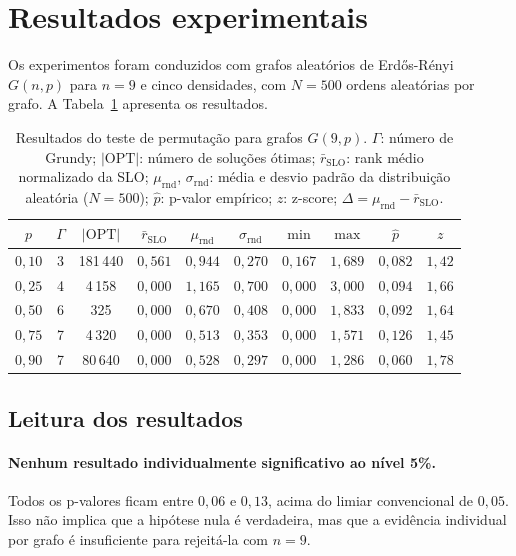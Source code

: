 \documentclass[a4paper,11pt]{article}
\begin{document}
\section{Resultados experimentais}

Os experimentos foram conduzidos com grafos aleatórios de Erdős-Rényi
$G(n,p)$ para $n=9$ e cinco densidades, com $N=500$ ordens aleatórias
por grafo. A Tabela~\ref{tab:resultados} apresenta os resultados.

\begin{table}[ht]
\centering
\caption{Resultados do teste de permutação para grafos $G(9, p)$.
$\Gamma$: número de Grundy; $|\text{OPT}|$: número de soluções ótimas;
$\bar{r}_{\text{SLO}}$: rank médio normalizado da SLO;
$\mu_{\text{rnd}}$, $\sigma_{\text{rnd}}$: média e desvio padrão da
distribuição aleatória ($N=500$);
$\hat{p}$: p-valor empírico; $z$: z-score; $\Delta = \mu_{\text{rnd}} -
\bar{r}_{\text{SLO}}$.}
\label{tab:resultados}
\renewcommand{\arraystretch}{1.25}
\begin{tabular}{cccccccccc}
\toprule
$p$ & $\Gamma$ & $|\text{OPT}|$ & $\bar{r}_{\text{SLO}}$ &
$\mu_{\text{rnd}}$ & $\sigma_{\text{rnd}}$ &
$\min$ & $\max$ & $\hat{p}$ & $z$ \\
\midrule
$0{,}10$ & 3 & 181\,440 & $0{,}561$ & $0{,}944$ & $0{,}270$ &
  $0{,}167$ & $1{,}689$ & $0{,}082$ & $1{,}42$ \\
$0{,}25$ & 4 & 4\,158   & $0{,}000$ & $1{,}165$ & $0{,}700$ &
  $0{,}000$ & $3{,}000$ & $0{,}094$ & $1{,}66$ \\
$0{,}50$ & 6 & 325      & $0{,}000$ & $0{,}670$ & $0{,}408$ &
  $0{,}000$ & $1{,}833$ & $0{,}092$ & $1{,}64$ \\
$0{,}75$ & 7 & 4\,320   & $0{,}000$ & $0{,}513$ & $0{,}353$ &
  $0{,}000$ & $1{,}571$ & $0{,}126$ & $1{,}45$ \\
$0{,}90$ & 7 & 80\,640  & $0{,}000$ & $0{,}528$ & $0{,}297$ &
  $0{,}000$ & $1{,}286$ & $0{,}060$ & $1{,}78$ \\
\bottomrule
\end{tabular}
\end{table}

\subsection{Leitura dos resultados}

\paragraph{Nenhum resultado individualmente significativo ao nível 5\%.}
Todos os p-valores ficam entre $0{,}06$ e $0{,}13$, acima do limiar
convencional de $0{,}05$. Isso não implica que a hipótese nula é
verdadeira, mas que a evidência individual por grafo é insuficiente
para rejeitá-la com $n=9$.
\end{document}
